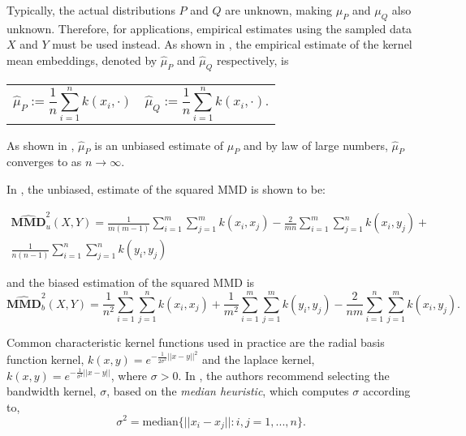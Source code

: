 Typically, the actual distributions $P$ and $Q$ are unknown, making $\mu_P$ and $\mu_Q$ also unknown. Therefore, for applications, empirical estimates using the sampled data $X$ and $Y$ must be used instead. As shown in \cite{muandet2017kernel}, the empirical estimate of the kernel mean embeddings, denoted by $\hat{\mu}_P$ and  $\hat{\mu}_Q$ respectively, is

\noindent
\begin{tabularx}{\linewidth}{@{}XX@{}}
\begin{equation}
  \hat{\mu}_P := \frac{1}{n} \sum_{i=1}^n k(x_i, \cdot)
\end{equation}
&
\begin{equation}
    \hat{\mu}_Q := \frac{1}{n} \sum_{i=1}^n k(x_i, \cdot).
\end{equation}
\end{tabularx}
As shown in \cite{sriperumbudur2012empirical}, $\hat{\mu}_P$ is an unbiased estimate of $\mu_P$  and by law of large numbers, $\hat{\mu}_P$ converges to as $n \to \infty$. 

In \cite{gretton2012kernel}, the unbiased, estimate of the squared MMD is shown to be:

\begin{equation}
\begin{split}
\widehat{\mathbf{M M D}}_{u}^{2}(X, Y)=\frac{1}{m(m-1)} \sum_{i=1}^m \sum_{ j=1}^{m} k\left(x_{i}, x_{j}\right)-\frac{2}{m n} \sum_{i=1}^m \sum_{ j=1}^{n} k\left(x_{i}, y_{j}\right)+ \\
\frac{1}{n(n-1)} \sum_{i=1}^n \sum_{j=1}^{n} k\left(y_{i}, y_{j}\right)
\end{split}
\end{equation}

and the biased estimation of the squared MMD is
\begin{equation}
\widehat{\mathbf{M M D}}_{b}^{2}(X, Y)= \frac{1}{n^{2}} \sum_{i=1}^{n} \sum_{j=1}^{n} k\left(x_{i}, x_{j}\right)+\frac{1}{m^{2}} \sum_{i=1}^{m} \sum_{j=1}^{m} k\left(y_{i}, y_{j}\right)-\frac{2}{n m} \sum_{i=1}^{n} \sum_{j=1}^{m} k\left(x_{i}, y_{j}\right).
\end{equation}


Common characteristic kernel functions used in practice are the radial basis function kernel, $k(x, y)= e^{-\frac{1}{2\sigma^2}||x-y||^2}$ and the laplace kernel, $k(x, y)= e^{-\frac{1}{\sigma^2}||x-y||}$, where $\sigma > 0$. In \cite{gretton2005kernel}, the authors recommend selecting the bandwidth kernel, $\sigma$, based on the \textit{median heuristic}, which computes $\sigma$ according to, 
\begin{equation}
\sigma^2=\text{median}\{||x_i-x_j||:i,j = 1,...,n \}.
\end{equation}

